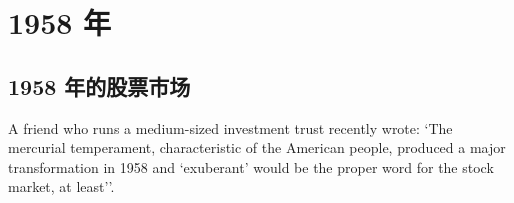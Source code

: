 \chapter{1958 年}

\section{1958 年的股票市场}

\begin{verseparallel}
  {
    \noindent A friend who runs a medium-sized investment trust recently wrote:
    `The mercurial temperament, characteristic of the American people, produced
    a major transformation in 1958 and ‘exuberant’ would be the proper word
    for the stock market, at least''.
  }
  {

  }
\end{verseparallel}


